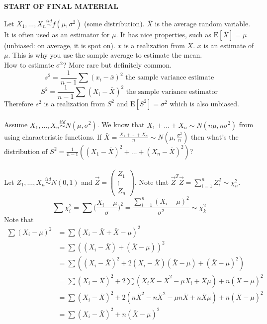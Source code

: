 \documentclass[12pt]{article}
\newcommand{\iid}{\stackrel{iid}{\sim}}
\newcommand{\expected}[1]{\mathrm{E}[#1]}
\begin{document}
\begin{center}  \textbf{START OF FINAL MATERIAL} \end{center}

Let $X_1, \dots, X_n \iid f(\mu, \sigma^2)$ (some distribution). $\bar{X}$ is the average random variable. It is often used as an estimator for $\mu$. It has nice properties, such as $\expected{\bar{X}} = \mu$ (unbiased: on average, it is spot on). $\bar{x}$ is a realization from $\bar{X}$. $\bar{x}$ is an estimate of $\mu$. This is why you use the sample average to estimate the mean. \\
How to estimate $\sigma^2$? More rare but definitely common. $$s^2 = \frac{1}{n-1} \sum (x_i - \bar{x})^2 \text{ the sample variance estimate} $$ $$ S^2 = \frac{1}{n-1} \sum (X_i - \bar{X})^2 \text{ the sample variance estimator} $$ Therefore $s^2$ is a realization from $S^2$ and $\expected{S^2} = \sigma^2$ which is also unbiased. \\~\\
Assume $X_1, \dots, X_n \iid N(\mu, \sigma^2)$. We know that $X_1 + \dots + X_n \sim N(n\mu, n\sigma^2)$ from using characteristic functions. If $\bar{X} = \frac{X_1 + \dots + X_n}{n} \sim N(\mu, \frac{\sigma^2}{n})$ then what's the distribution of $S^2 = \frac{1}{n-1}((X_1 - \bar{X})^2 + \dots + (X_n - \bar{X})^2)$? \\~\\
Let $Z_1, \dots, X_n \iid N(0,1)$ and $\vec{Z} = \begin{pmatrix} Z_1 \\ \vdots \\ Z_n \end{pmatrix}$. Note that $\vec{Z}^T\vec{Z} = \sum_{i =1}^n Z_i^2 \sim \chi_n^2$. 
$$ \sum \chi_i^2 = \sum \Big( \frac{X_i - \mu}{\sigma}\Big)^2 = \frac{\sum_{i=1}^n (X_i - \mu)^2}{\sigma^2} \sim \chi_k^2 $$ 
Note that $$ \begin{aligned} \sum (X_i - \mu)^2 &= \sum (X_i - \bar{X} + \bar{X} - \mu)^2 \\ &= \sum ((X_i - \bar{X}) + (\bar{X} - \mu))^2 \\ &= \sum((X_i - \bar{X})^2 + 2(X_i - \bar{X})(\bar{X}-\mu) + (\bar{X} - \mu)^2) \\ &= \sum (X_i - \bar{X})^2 + 2\sum (X_i\bar{X} - \bar{X}^2 - \mu X_i + \bar{X}\mu) + n(\bar{X} - \mu)^2 \\ &= \sum (X_i - \bar{X})^2 + 2(n\bar{X}^2 - n\bar{X}^2 - \mu n\bar{X} + n\bar{X}\mu) + n(\bar{X} - \mu)^2 \\ &= \sum (X_i - \bar{X})^2 + n(\bar{X} - \mu)^2 \end{aligned} $$
\end{document}
